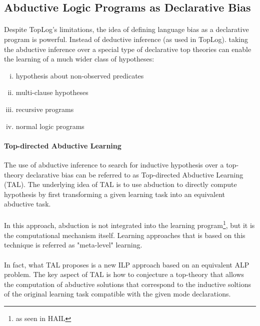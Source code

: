 \documentclass{article}
\theoremstyle{plain}
\theoremstyle{definition}
\begin{document}
\begin{multicols}{2}
\subsection{Abductive Logic Programs as Declarative Bias}

\paragraph{} Despite TopLog's limitations, the idea of defining language bias as a declarative program is powerful. Instead of deductive inference (as used in TopLog). taking the abductive inference over a special type of declarative top theories can enable the learning of a much wider class of hypotheses:

\begin{enumerate}[i)]
\item hypothesis about non-observed predicates
\item multi-clause hypotheses
\item recursive programs
\item normal logic programs
\end{enumerate}

\paragraph{Top-directed Abductive Learning} The use of abductive inference to search for inductive hypothesis over a top-theory declarative bias can be referred to as Top-directed Abductive Learning (TAL). The underlying idea of TAL is to use abduction to directly compute hypothesis by first transforming a given learning task into an equivalent abductive task. 

\paragraph{} In this approach, abduction is not integrated into the learning program\footnote{as seen in HAIL}, but it is the computational mechanism itself. Learning approaches that is based on this technique is referred as "meta-level" learning.

\paragraph{} In fact, what TAL proposes is a new ILP approach based on an equivalent ALP problem. The key aspect of TAL is how to conjecture a top-theory that allows the computation of abductive solutions that correspond to the inductive soltions of the original learning task compatible with the given mode declarations.


\end{multicols}
\end{document}
